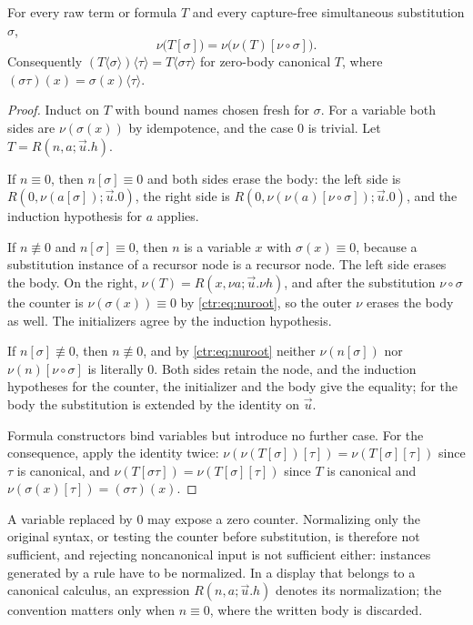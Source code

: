 \begin{lemma}\label{ctr:lem:coherence}
For every raw term or formula $T$ and every capture-free simultaneous substitution $\sigma$,
\[
 \nu\bigl(T[\sigma]\bigr)=\nu\bigl(\nu(T)[\nu\circ\sigma]\bigr).
\]
Consequently $(T\langle\sigma\rangle)\langle\tau\rangle=T\langle\sigma\tau\rangle$ for
zero-body canonical $T$, where $(\sigma\tau)(x)=\sigma(x)\langle\tau\rangle$.
\end{lemma}
\begin{proof}
Induct on $T$ with bound names chosen fresh for $\sigma$. For a variable both sides are
$\nu(\sigma(x))$ by idempotence, and the case $0$ is trivial. Let $T=R(n,a;\vec u.h)$.

If $n\equiv 0$, then $n[\sigma]\equiv 0$ and both sides erase the body: the left side is
$R(0,\nu(a[\sigma]);\vec u.0)$, the right side is
$R(0,\nu(\nu(a)[\nu\circ\sigma]);\vec u.0)$, and the induction hypothesis for $a$ applies.

If $n\not\equiv 0$ and $n[\sigma]\equiv 0$, then $n$ is a variable $x$ with
$\sigma(x)\equiv 0$, because a substitution instance of a recursor node is a recursor node.
The left side erases the body. On the right, $\nu(T)=R(x,\nu a;\vec u.\nu h)$, and after the
substitution $\nu\circ\sigma$ the counter is $\nu(\sigma(x))\equiv 0$ by
\eqref{ctr:eq:nuroot}, so the outer $\nu$ erases the body as well. The initializers agree
by the induction hypothesis.

If $n[\sigma]\not\equiv 0$, then $n\not\equiv 0$, and by \eqref{ctr:eq:nuroot} neither
$\nu(n[\sigma])$ nor $\nu(n)[\nu\circ\sigma]$ is literally $0$. Both sides retain the node,
and the induction hypotheses for the counter, the initializer and the body give the
equality; for the body the substitution is extended by the identity on $\vec u$.

Formula constructors bind variables but introduce no further case. For the consequence,
apply the identity twice: $\nu(\nu(T[\sigma])[\tau])=\nu(T[\sigma][\tau])$ since $\tau$ is
canonical, and $\nu(T[\sigma\tau])=\nu(T[\sigma][\tau])$ since $T$ is canonical and
$\nu(\sigma(x)[\tau])=(\sigma\tau)(x)$.
\end{proof}

A variable replaced by $0$ may expose a zero counter. Normalizing only the original syntax,
or testing the counter before substitution, is therefore not sufficient, and rejecting
noncanonical input is not sufficient either: instances generated by a rule have to be
normalized. In a display that belongs to a canonical calculus, an expression
$R(n,a;\vec u.h)$ denotes its normalization; the convention matters only when
$n\equiv 0$, where the written body is discarded.

